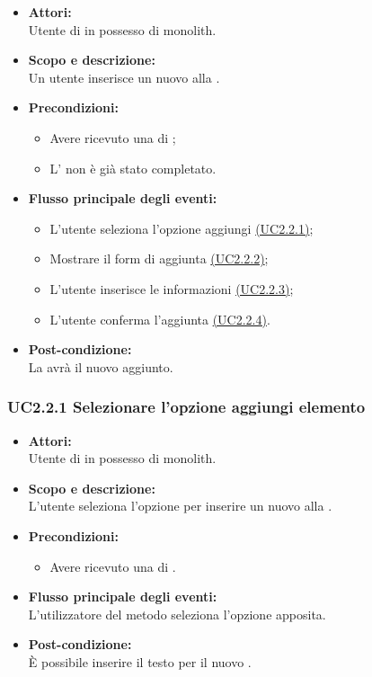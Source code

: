 \begin{itemize}
	\item \textbf{Attori:}
	\\Utente di  in possesso di monolith.
	\item \textbf{Scopo e descrizione:} 
	\\Un utente inserisce un nuovo  alla .
	\item \textbf{Precondizioni:}
	\begin{itemize}
		\item Avere ricevuto una  di ;
		\item L’ non è già stato completato.
	\end{itemize}
	\item \textbf{Flusso principale degli eventi:}
	\begin{itemize}
		\item L'utente seleziona l'opzione aggiungi  \hyperref[UC2.2.1]{(UC2.2.1)};
		\item Mostrare il form di aggiunta \hyperref[UC2.2.2]{(UC2.2.2)};
		\item L'utente inserisce le informazioni \hyperref[UC2.2.3]{(UC2.2.3)};
		\item L'utente conferma l'aggiunta \hyperref[UC2.2.4]{(UC2.2.4)}.
	\end{itemize}
	\item \textbf{Post-condizione:}
	\\La {} avrà il nuovo  aggiunto.
\end{itemize}

\subsubsection{UC2.2.1 Selezionare l'opzione aggiungi elemento} \label{UC2.2.1}

\begin{itemize}
	\item \textbf{Attori:}
	\\Utente di  in possesso di monolith.
	\item \textbf{Scopo e descrizione:} 
	\\L'utente seleziona l'opzione per inserire un nuovo  alla .
	\item \textbf{Precondizioni:}
	\begin{itemize}
		\item Avere ricevuto una  di .
	\end{itemize}
	\item \textbf{Flusso principale degli eventi:}
	\\L'utilizzatore del metodo seleziona l'opzione apposita.
	\item \textbf{Post-condizione:}
	\\È possibile inserire il testo per il nuovo . 
\end{itemize}

